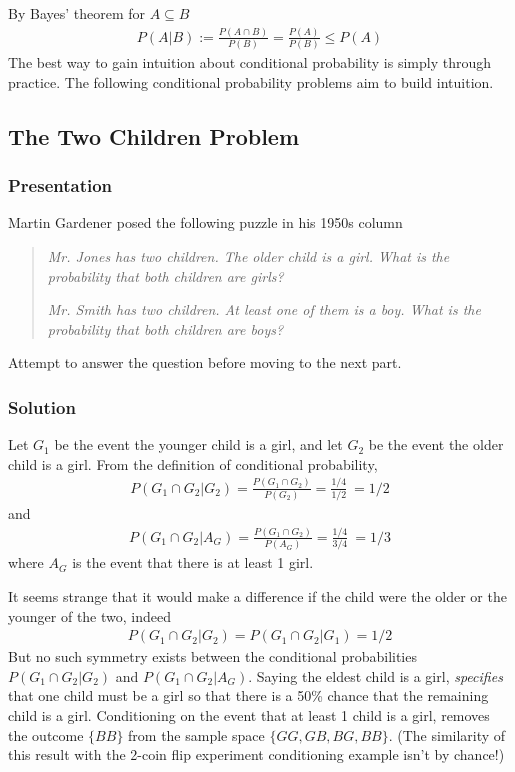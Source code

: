 \documentclass[11pt,a4paper]{article}
\begin{document}
By Bayes' theorem for \(A \subseteq B\)
\begin{align}
P(A|B) := \frac{P(A\cap B)}{P(B)} = \frac{P(A)}{P(B)} \leq P(A)
\end{align}
The best way to gain intuition about conditional probability is simply through practice. 
The following conditional probability problems aim to build intuition.

\subsection{The Two Children Problem}%

\subsubsection{Presentation}

Martin Gardener posed the following puzzle in his 1950s column

\begin{quote}
\emph{Mr. Jones has two children. The older child is a girl. What is the
probability that both children are girls?}

\emph{Mr. Smith has two children. At least one of them is a boy. What is
the probability that both children are boys?}
\end{quote}

Attempt to answer the question before moving to the next part.

\newpage
\subsubsection{Solution}

Let \(G_{1}\) be the event the younger child is a girl,
and let \(G_{2}\) be the event the older child is a girl. 
From the definition of conditional probability,
\begin{align}
P\left( G_{1} \cap G_{2} | G_{2} \right) = 
\frac{P\left( G_{1} \cap G_{2} \right)}{P\left( G_{2} \right)} = \frac{1/4}{1/2}\  = 1/2
\end{align}
and
\begin{align}
P\left( G_{1} \cap G_{2} | A_{G} \right) = 
\frac{P\left( G_{1} \cap G_{2} \right)}{P\left( A_{G} \right)} = \frac{1/4}{3/4}\  = 1/3
\end{align}
where \(A_{G}\) is the event that there is at least 1 girl.

It seems strange that it would make a difference if the child were the
older or the younger of the two, 
indeed
\begin{align}
P\left( G_{1} \cap G_{2} | G_{2} \right) = P\left( G_{1} \cap G_{2} | G_{1} \right) = 1/2
\end{align}
But no such symmetry exists between the conditional probabilities
\(P\left( G_{1} \cap G_{2} | G_{2} \right)\) and
\(P\left( G_{1} \cap G_{2} | A_{G} \right)\). 
Saying the eldest child is a girl, 
\emph{specifies} that one child must be a girl so that there is a 50\% chance that the remaining child is a girl. 
Conditioning on the event that at least 1 child is a girl, 
removes the outcome \(\{ BB\}\) from the sample space \(\{GG, GB, BG, BB\}\). 
(The similarity of this result with the 2-coin flip experiment conditioning example isn't by chance!)
\end{document}
